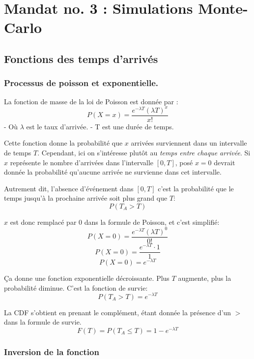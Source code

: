     \section{Mandat no. 3 : Simulations
Monte-Carlo}\label{mandat-no.-3-simulations-monte-carlo}

    \subsection{Fonctions des temps
d'arrivés}\label{fonctions-des-temps-darrivuxe9s}

    \subsubsection{Processus de poisson et
exponentielle.}\label{processus-de-poisson-et-exponentielle.}

    La fonction de masse de la loi de Poisson est donnée par : \[
P(X=x)=\frac{e^{-\lambda T}(\lambda T)^x}{x!}
\] - Où \(\lambda\) est le taux d'arrivée. - T est une durée de temps.

Cette fonction donne la probabilité que \(x\) arrivées surviennent dans
un intervalle de temps \(T\). Cependant, ici on s'intéresse plutôt au
\emph{temps entre chaque arrivée}. Si \(x\) représente le nombre
d'arrivées dans l'intervalle \([0,T]\), posé \(x=0\) devrait donnée la
probabilité qu'aucune arrivée ne survienne dans cet intervalle.

Autrement dit, l'absence d'événement dans \([0,T]\) c'est la probabilité
que le temps jusqu'à la prochaine arrivée soit plus grand que \(T\): \[
P(T_A > T)
\]

\(x\) est donc remplacé par \(0\) dans la formule de Poisson, et c'est
simplifié: \[
P(X=0)=\frac{e^{-\lambda T}(\lambda T)^0}{0!}
\] \[
P(X=0)=\frac{e^{-\lambda T}\cdot 1}{1}
\] \[
P(X=0)=e^{-\lambda T}
\]

Ça donne une fonction exponentielle décroissante. Plus \(T\) augmente,
plus la probabilité diminue. C'est la fonction de survie: \[
P(T_A > T) = e^{-\lambda T}
\]

La CDF s'obtient en prenant le complément, étant donnée la présence d'un
\(>\) dans la formule de survie. \[
F(T)=P(T_A \le T)=1 - e^{-\lambda T}
\]

    \subsubsection{Inversion de la fonction}\label{inversion-de-la-fonction}

